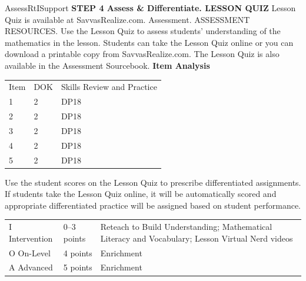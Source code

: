 \documentclass{article}
\newenvironment{te-addendum}[2]{}{}     %
\begin{document}
\begin{te-addendum}{Assess}{RtISupport}
\textbf{STEP 4 Assess \& Differentiate. LESSON QUIZ}
Lesson Quiz is available at SavvasRealize.com. Assessment. ASSESSMENT RESOURCES.
Use the Lesson Quiz to assess students' understanding of the mathematics in the lesson.
Students can take the Lesson Quiz online or you can download a printable copy from SavvasRealize.com. The Lesson Quiz is also available in the Assessment Sourcebook.
\textbf{Item Analysis}
\begin{tabular}{lll}
Item & DOK & Skills Review and Practice \\
1 & 2 & DP18 \\
2 & 2 & DP18 \\
3 & 2 & DP18 \\
4 & 2 & DP18 \\
5 & 2 & DP18 \\
\end{tabular}
Use the student scores on the Lesson Quiz to prescribe differentiated assignments.
If students take the Lesson Quiz online, it will be automatically scored and appropriate differentiated practice will be assigned based on student performance.
\begin{tabular}{lll}
I Intervention & 0--3 points & Reteach to Build Understanding; Mathematical Literacy and Vocabulary; Lesson Virtual Nerd videos \\
O On-Level & 4 points & Enrichment \\
A Advanced & 5 points & Enrichment \\
\end{tabular}
\end{te-addendum}
\end{document}
